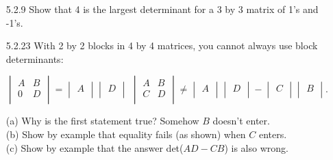 \documentclass[10pt,twoside,reqno]{article}
\begin{document}
\begin{enumerate}
\item[5.2.9] Show that 4 is the largest determinant for a 3 by 3 matrix of 1's and -1's. \\
\vspace{3mm}



\vspace{3mm}

\item[5.2.23] With 2 by 2 blocks in 4 by 4 matrices, you cannot always use block determinants: \\
\begin{center}
$
\begin{vmatrix}
A&B\\
0&D\\
\end{vmatrix}
=
\begin{vmatrix}
A\\
\end{vmatrix}
\begin{vmatrix}
D\\
\end{vmatrix}
$
\hspace{10mm}
$
\begin{vmatrix}
A&B\\
C&D\\
\end{vmatrix}
\neq
\begin{vmatrix}
A\\
\end{vmatrix}
\begin{vmatrix}
D\\
\end{vmatrix}
-
\begin{vmatrix}
C\\
\end{vmatrix}
\begin{vmatrix}
B\\
\end{vmatrix}
$. \\
\end{center}
{\addtolength{\leftskip}{10mm}
(a) Why is the first statement true? Somehow $B$ doesn't enter. \\ \vspace{2mm}
(b) Show by example that equality fails (as shown) when $C$ enters. \\ \vspace{2mm}
(c) Show by example that the answer det($AD-CB$) is also wrong. \\ \vspace{2mm}
}
\vspace{3mm}




\end{enumerate}
\end{document}

